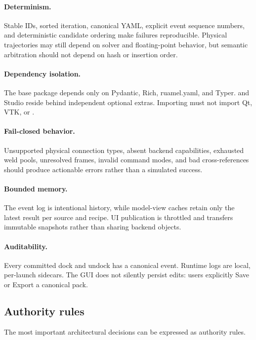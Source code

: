 \paragraph{Determinism.}
Stable IDs, sorted iteration, canonical YAML, explicit event sequence numbers, and
deterministic candidate ordering make failures reproducible. Physical trajectories may
still depend on solver and floating-point behavior, but semantic arbitration should not
depend on hash or insertion order.

\paragraph{Dependency isolation.}
The base package depends only on Pydantic, Rich, ruamel.yaml, and Typer. \mujoco{} and
Studio reside behind independent optional extras. Importing  must not
import Qt, VTK, or \mujoco{}.

\paragraph{Fail-closed behavior.}
Unsupported physical connection types, absent backend capabilities, exhausted weld
pools, unresolved frames, invalid command modes, and bad cross-references should
produce actionable errors rather than a simulated success.

\paragraph{Bounded memory.}
The event log is intentional history, while model-view caches retain only the latest
result per source and recipe. UI publication is throttled and transfers immutable
snapshots rather than sharing backend objects.

\paragraph{Auditability.}
Every committed dock and undock has a canonical event. Runtime logs are local,
per-launch sidecars. The GUI does not silently persist edits: users explicitly Save or
Export a canonical pack.

\subsection{Authority rules}

The most important architectural decisions can be expressed as authority rules.

